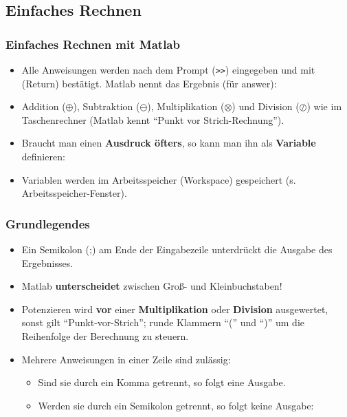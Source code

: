     \subsection{Einfaches Rechnen}
    \begin{frame}
      \frametitle{Einfaches Rechnen mit Matlab}
      \begin{itemize}
        \itemsep0.3cm
        \item Alle Anweisungen werden nach dem Prompt (\texttt{>>}) eingegeben und mit \keys{\return} (Return) bestätigt. Matlab nennt das Ergebnis  (für answer):

        \vspace{-0.3cm}


        \item Addition ($\oplus$), Subtraktion ($\ominus$), Multiplikation ($\otimes$) und Division ($\oslash$) wie im Taschenrechner (Matlab kennt ``Punkt vor Strich-Rechnung'').
        \item Braucht man einen \textbf{Ausdruck öfters}, so kann man ihn als \textbf{Variable} definieren:

        \vspace{-0.3cm}


        \item Variablen werden im Arbeitsspeicher (Workspace) gespeichert (s. Arbeitsspeicher-Fenster).
      \end{itemize}
    \end{frame}

    \begin{frame}
      \frametitle{Grundlegendes}
      \begin{itemize}
        \item Ein Semikolon (;) am Ende der Eingabezeile unterdrückt die Ausgabe des Ergebnisses.
        \item Matlab \textbf{unterscheidet} zwischen Groß- und Kleinbuchstaben!
        \item Potenzieren wird \textbf{vor} einer \textbf{Multiplikation} oder \textbf{Division} ausgewertet, sonst gilt ``Punkt-vor-Strich''; runde Klammern ``('' und ``)'' um die Reihenfolge der Berechnung zu steuern.
        \item Mehrere Anweisungen in einer Zeile sind zulässig:

        \begin{itemize}
          \item Sind sie durch ein Komma getrennt, so folgt eine Ausgabe.
          \item Werden sie durch ein Semikolon getrennt, so folgt keine Ausgabe:

          \vspace{-0.3cm}


        \end{itemize}
      \end{itemize}
    \end{frame}

